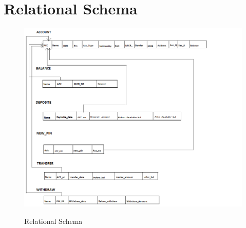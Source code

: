 \thispagestyle{fancy}

\section{Relational Schema}
\begin{figure}[H]
\centering
\caption{Relational Schema}
\includegraphics[scale=.5]{./rs.png}
\\[0.2in]
\label{fig:Relational Schema}
\end{figure}

\thispagestyle{fancy}